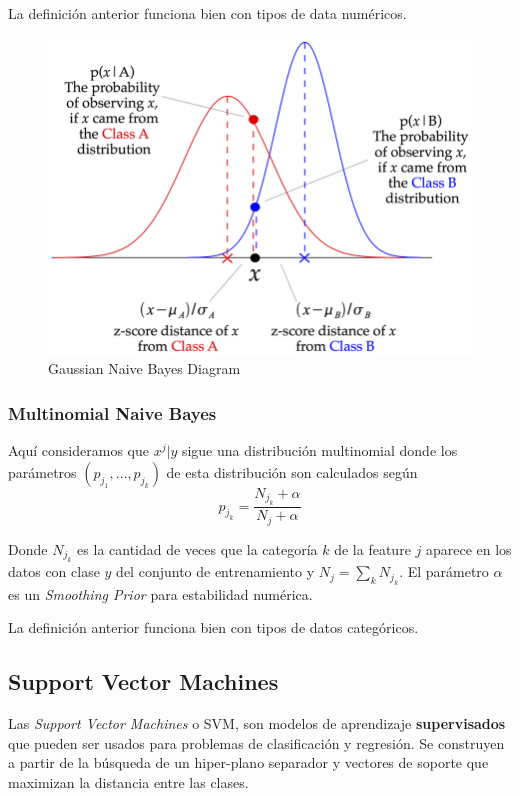 La definición anterior funciona bien con tipos de data numéricos. 

\begin{figure}[H]
    \center
    \includegraphics[scale=2]{notebooks/ML/img/gaussian_naive_bayes_diagram.png}
    \caption{Gaussian Naive Bayes Diagram}
\end{figure}

\subsubsection{Multinomial Naive Bayes}

Aquí consideramos que $x^j | y$ sigue una distribución multinomial donde los parámetros $(p_{j_1}, \dots , p_{j_k})$ de esta distribución son calculados según 
$$
p_{j_k} = \frac{N_{j_k} + \alpha}{N_j + \alpha}  
$$

Donde $N_{j_k}$ es la cantidad de veces que la categoría $k$ de la feature $j$ aparece en los datos con clase $y$ del conjunto de entrenamiento y $N_j = \sum_k N_{j_k}$. El parámetro $\alpha$ es un \textit{Smoothing Prior} para estabilidad numérica. 

La definición anterior funciona bien con tipos de datos categóricos. 

\subsection{Support Vector Machines}

Las \textit{Support Vector Machines} o SVM, son modelos de aprendizaje \textbf{supervisados} que pueden ser usados para problemas de clasificación y regresión. Se construyen a partir de la búsqueda de un hiper-plano separador y vectores de soporte que maximizan la distancia entre las clases. 

